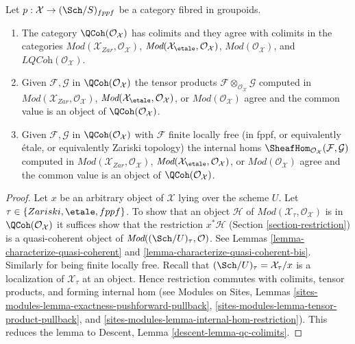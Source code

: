 \begin{lemma}
\label{lemma-qc-colimits}
Let $p : \mathcal{X} \to (\Sch/S)_{fppf}$ be a category
fibred in groupoids.
\begin{enumerate}
\item The category $\QCoh(\mathcal{O}_\mathcal{X})$
has colimits and they agree with colimits in the categories
$\textit{Mod}(\mathcal{X}_{Zar}, \mathcal{O}_\mathcal{X})$,
$\textit{Mod}(\mathcal{X}_\etale, \mathcal{O}_\mathcal{X})$,
$\textit{Mod}(\mathcal{O}_\mathcal{X})$, and
$\textit{LQCoh}(\mathcal{O}_\mathcal{X})$.
\item Given $\mathcal{F}, \mathcal{G}$ in $\QCoh(\mathcal{O}_\mathcal{X})$
the tensor products $\mathcal{F} \otimes_{\mathcal{O}_\mathcal{X}} \mathcal{G}$
computed in $\textit{Mod}(\mathcal{X}_{Zar}, \mathcal{O}_\mathcal{X})$,
$\textit{Mod}(\mathcal{X}_\etale, \mathcal{O}_\mathcal{X})$, or
$\textit{Mod}(\mathcal{O}_\mathcal{X})$ agree and the common value
is an object of $\QCoh(\mathcal{O}_\mathcal{X})$.
\item Given $\mathcal{F}, \mathcal{G}$ in $\QCoh(\mathcal{O}_\mathcal{X})$
with $\mathcal{F}$ finite locally free (in fppf, or equivalently \'etale, or
equivalently Zariski topology) the internal homs
$\SheafHom_{\mathcal{O}_\mathcal{X}}(\mathcal{F}, \mathcal{G})$
computed in $\textit{Mod}(\mathcal{X}_{Zar}, \mathcal{O}_\mathcal{X})$,
$\textit{Mod}(\mathcal{X}_\etale, \mathcal{O}_\mathcal{X})$, or
$\textit{Mod}(\mathcal{O}_\mathcal{X})$ agree and the common value
is an object of $\QCoh(\mathcal{O}_\mathcal{X})$.
\end{enumerate}
\end{lemma}

\begin{proof}
Let $x$ be an arbitrary object of $\mathcal{X}$ lying over the scheme $U$.
Let $\tau \in \{Zariski, \etale, fppf\}$. To show that an object $\mathcal{H}$
of $\textit{Mod}(\mathcal{X}_\tau, \mathcal{O}_\mathcal{X})$ is
in $\QCoh(\mathcal{O}_\mathcal{X})$ it suffices show that the
restriction $x^*\mathcal{H}$ (Section \ref{section-restriction})
is a quasi-coherent object of $\textit{Mod}((\Sch/U)_\tau, \mathcal{O})$.
See Lemmas \ref{lemma-characterize-quasi-coherent} and
\ref{lemma-characterize-quasi-coherent-bis}. Similarly for being
finite locally free. Recall that $(\Sch/U)_\tau = \mathcal{X}_\tau/x$
is a localization of $\mathcal{X}_\tau$ at an object. Hence restriction
commutes with colimits, tensor products, and forming internal hom
(see Modules on Sites, Lemmas
\ref{sites-modules-lemma-exactness-pushforward-pullback},
\ref{sites-modules-lemma-tensor-product-pullback}, and
\ref{sites-modules-lemma-internal-hom-restriction}).
This reduces the lemma to Descent, Lemma \ref{descent-lemma-qc-colimits}.
\end{proof}







